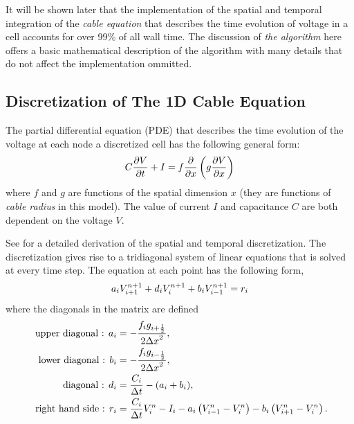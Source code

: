 It will be shown later that the implementation of the spatial and temporal integration of the \emph{cable equation} that describes the time evolution of voltage in a cell accounts for over 99\% of all wall time. The discussion of \emph{the algorithm} here offers a basic mathematical description of the algorithm with many details that do not affect the implementation ommitted.

\subsection{Discretization of The 1D Cable Equation}
The partial differential equation (PDE) that describes the time evolution of the voltage at each node a discretized cell has the following general form:
\begin{equation}
     C\frac{\partial{V}}{\partial{t}} + I = f \frac{\partial{}}{\partial{x}} \left( g\frac{\partial{V}}{\partial{x}} \right)
\end{equation}
where $f$ and $g$ are functions of the spatial dimension $x$ (they are functions of \emph{cable radius} in this model). The value of current $I$ and capacitance $C$ are both dependent on the voltage $V$.

See  for a detailed derivation of the spatial and temporal discretization. The discretization gives rise to a tridiagonal system of linear equations that is solved at every time step. The equation at each point has the following form,
\begin{equation}
    {a}_{i} {V}_{i+1}^{n+1} + {d}_{i} {V}_{i}^{n+1} + {b}_{i} {V}_{i-1}^{n+1} = {r}_{i}
\end{equation}
where the diagonals in the matrix are defined
\begin{align}
    \text{ upper diagonal : }  {a}_{i}  &=  -\frac{{f}_{i}{g}_{i+\frac{1}{2}}}{2{\Delta x}^2}, \nonumber \\
    \text{ lower diagonal : }  {b}_{i}  &=  -\frac{{f}_{i}{g}_{i-\frac{1}{2}}}{2{\Delta x}^2}, \nonumber \\
    \text{       diagonal : }  {d}_{i}  &=  \frac{{C}_{i}}{{\Delta t}} - ( {a}_{i} + {b}_{i} ), \nonumber \\
    \text{right hand side : }  {r}_{i}  &=  \frac{{C}_{i}}{{\Delta t}} {V}_{i}^n
                - {I}_{i}
                - {a}_{i} \left( {V}_{i-1}^{n} - {V}_{i}^{n} \right)
                - {b}_{i} \left( {V}_{i+1}^{n}  - {V}_{i}^{n} \right). \nonumber
\end{align}

